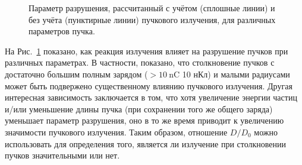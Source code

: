 \begin{figure}[ht]
    \caption[Параметр разрушения, рассчитанный с учётом и без учёта пучкового излучения, для различных параметров пучка]{\label{fig:ch3/Q_disruption} 
    Параметр разрушения, рассчитанный с учётом (сплошные линии) и без учёта (пунктирные линии) пучкового излучения, для различных параметров пучка.}
\end{figure}

На Рис.~\ref{fig:ch3/Q_disruption} показано, как реакция излучения влияет на разрушение пучков при различных параметрах.
В частности, показано, что столкновение пучков с достаточно большим полным зарядом ($> \SI{10}{\nano\coulomb}$ 10 нКл) и малыми радиусами может быть подвержено существенному влиянию пучкового излучения.
Другая интересная зависимость заключается в том, что хотя увеличение энергии частиц и/или уменьшение длины пучка (при сохранении того же общего заряда) уменьшает параметр разрушения, оно в то же время приводит к увеличению значимости пучкового излучения.
Таким образом, отношение $D/D_0$ можно использовать для определения того, является ли излучение при столкновении пучков значительными или нет.

